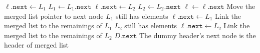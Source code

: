 \begin{algorithm}[H]
\begin{algorithmic}[1]
\State $\ell.\texttt{next}\gets L_1$
\State $L_1\gets L_1.\texttt{next}$
\Else
\State $\ell.\texttt{next}\gets L_2$
\State $L_2\gets L_2.\texttt{next}$
\EndIf
\State $\ell\gets\ell.\texttt{next}$ \Comment Move the merged list pointer to next node
\EndWhile
{} \Comment $L_1$ still has elements 
\State $\ell.\texttt{next}\gets L_1$ \Comment Link the merged list to the remainings of $L_1$
\EndIf
{} \Comment $L_2$ still has elements 
\State $\ell.\texttt{next}\gets L_2$ \Comment Link the merged list to the remainings of $L_2$
\EndIf
\State \Return $D.\texttt{next}$ \Comment The dummy header's next node is the header of merged list
\EndFunction
\end{algorithmic}
\end{algorithm}
